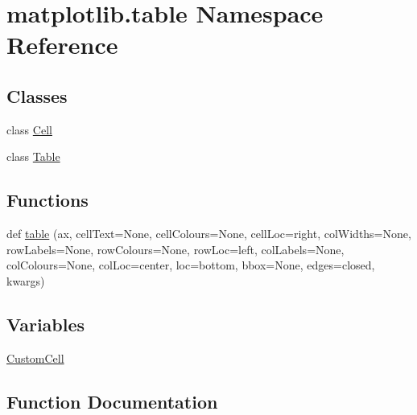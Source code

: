 \hypertarget{namespacematplotlib_1_1table}{}\section{matplotlib.\+table Namespace Reference}
\label{namespacematplotlib_1_1table}
\subsection*{Classes}
\begin{DoxyCompactItemize}
\item 
class \hyperlink{classmatplotlib_1_1table_1_1Cell}{Cell}
\item 
class \hyperlink{classmatplotlib_1_1table_1_1Table}{Table}
\end{DoxyCompactItemize}
\subsection*{Functions}
\begin{DoxyCompactItemize}
\item 
def \hyperlink{namespacematplotlib_1_1table_ad26b1da40447e1db89274755fd108887}{table} (ax, cell\+Text=None, cell\+Colours=None, cell\+Loc=\textquotesingle{}right\textquotesingle{}, col\+Widths=None, row\+Labels=None, row\+Colours=None, row\+Loc=\textquotesingle{}left\textquotesingle{}, col\+Labels=None, col\+Colours=None, col\+Loc=\textquotesingle{}center\textquotesingle{}, loc=\textquotesingle{}bottom\textquotesingle{}, bbox=None, edges=\textquotesingle{}closed\textquotesingle{}, kwargs)
\end{DoxyCompactItemize}
\subsection*{Variables}
\begin{DoxyCompactItemize}
\item 
\hyperlink{namespacematplotlib_1_1table_a9e60ecfcd412a387f7aebb19a6d395df}{Custom\+Cell}
\end{DoxyCompactItemize}


\subsection{Function Documentation}
\mbox{\label{namespacematplotlib_1_1table_ad26b1da40447e1db89274755fd108887}} 

